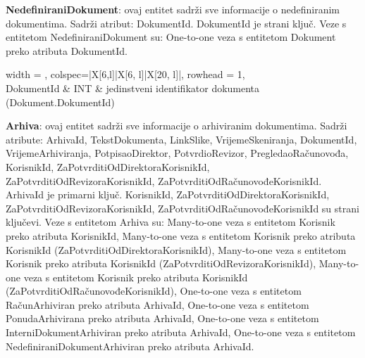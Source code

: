 				\textbf{NedefiniraniDokument}: ovaj entitet sadrži sve informacije o nedefiniranim dokumentima. Sadrži atribut: DokumentId. DokumentId je strani ključ.
				Veze s entitetom NedefiniraniDokument su: One-to-one veza s entitetom Dokument preko atributa DokumentId.
				
				
				\begin{longtblr}[
					label=none,
					entry=none
					]{
						width = \textwidth,
						colspec={|X[6,l]|X[6, l]|X[20, l]|}, 
						rowhead = 1,
					} %
					\hline {}	 \\ \hline[3pt]
					DokumentId & INT	&  	jedinstveni identifikator dokumenta (Dokument.DokumentId)  	\\ \hline
				\end{longtblr}

				\textbf{Arhiva}: ovaj entitet sadrži sve informacije o arhiviranim dokumentima. Sadrži atribute: ArhivaId, TekstDokumenta, LinkSlike, VrijemeSkeniranja, DokumentId, VrijemeArhiviranja, PotpisaoDirektor, PotvrdioRevizor, PregledaoRačunovođa, KorisnikId, ZaPotvrditiOdDirektoraKorisnikId, ZaPotvrditiOdRevizoraKorisnikId, ZaPotvrditiOdRačunovođeKorisnikId. ArhivaId je primarni ključ. KorisnikId, ZaPotvrditiOdDirektoraKorisnikId, ZaPotvrditiOdRevizoraKorisnikId, ZaPotvrditiOdRačunovođeKorisnikId su strani ključevi.
				Veze s entitetom Arhiva su: Many-to-one veza s entitetom Korisnik preko atributa KorisnikId,
				Many-to-one veza s entitetom Korisnik preko atributa KorisnikId (ZaPotvrditiOdDirektoraKorisnikId),
				Many-to-one veza s entitetom Korisnik preko atributa KorisnikId (ZaPotvrditiOdRevizoraKorisnikId),
				Many-to-one veza s entitetom Korisnik preko atributa KorisnikId (ZaPotvrditiOdRačunovođeKorisnikId),
				One-to-one veza s entitetom RačunArhiviran preko atributa ArhivaId,
				One-to-one veza s entitetom PonudaArhivirana preko atributa ArhivaId,
				One-to-one veza s entitetom InterniDokumentArhiviran preko atributa ArhivaId,
				One-to-one veza s entitetom NedefiniraniDokumentArhiviran preko atributa ArhivaId.

				
				
